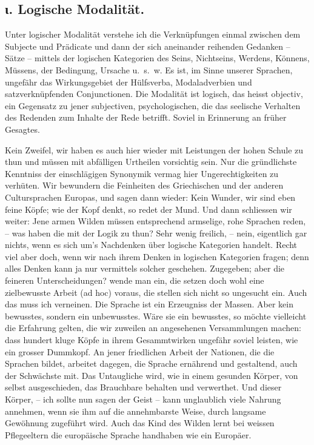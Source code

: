 \subsection*{ι. Logische Modalität.}\label{IV.IV.Iciota}

Unter logischer Modalität verstehe ich die Verknüpfungen einmal zwischen dem Subjecte und Prädicate und dann der sich aneinander reihenden Gedanken – Sätze – mittels der logischen Kategorien des Seins, Nichtseins, Werdens, Könnens, Müssens, der Bedingung, Ursache u.~s.~w. Es ist, im Sinne unserer Sprachen, ungefähr das Wirkungsgebiet der Hülfsverba, Modaladverbien und satzverknüpfenden Conjunctionen. Die Modalität ist logisch, das heisst objectiv, ein Gegensatz zu jener subjectiven, psychologischen, die das seelische Verhalten des Redenden zum Inhalte der Rede betrifft. Soviel in Erinnerung an früher Gesagtes.

\largerpage
Kein Zweifel, wir haben es auch hier wieder mit Leistungen der hohen Schule zu thun und müssen mit abfälligen Urtheilen vorsichtig sein. Nur die gründlichste Kenntniss der einschlägigen Synonymik vermag hier Ungerechtigkeiten zu verhüten. Wir bewundern die Feinheiten des Griechischen und der anderen Cultursprachen Europas, und sagen dann wieder: Kein Wunder, wir sind eben feine Köpfe; wie der Kopf denkt, so redet der Mund. Und dann schliessen wir weiter: Jene armen Wilden müssen entsprechend armselige, rohe Sprachen reden, – was haben die mit der Logik zu thun? Sehr wenig freilich, – nein, eigentlich gar nichts, wenn es sich um’s Nachdenken über logische Kategorien handelt. Recht viel aber doch, wenn wir nach ihrem Denken in logischen Kategorien fragen; denn alles Denken kann ja nur vermittels solcher geschehen. Zugegeben; aber die feineren Unterscheidungen? wende man ein, die setzen doch wohl eine zielbewusste Arbeit (ad hoc) voraus, die stellen sich nicht so ungesucht ein. Auch das muss ich verneinen. Die Sprache ist ein Erzeugniss der Massen. Aber kein bewusstes, sondern ein unbewusstes. Wäre sie ein bewusstes, so möchte vielleicht die Erfahrung gelten, die wir zuweilen an angesehenen Versammlungen machen: dass hundert kluge Köpfe in ihrem Gesammtwirken ungefähr soviel leisten, wie ein grosser Dummkopf. An jener friedlichen Arbeit der Nationen, die die Sprachen bildet, arbeitet dagegen, die Sprache er\label{fp.452}nährend und gestaltend, auch der Schwächste mit. Das Untaugliche wird, wie in einem gesunden Körper, von selbst ausgeschieden, das Brauchbare behalten und verwerthet. Und dieser Körper, – ich sollte nun sagen der Geist – kann unglaublich viele Nahrung annehmen, wenn sie ihm auf die annehmbarste Weise, durch langsame Gewöhnung zugeführt wird. Auch das Kind des Wilden lernt bei weissen Pflegeeltern die europäische Sprache handhaben wie ein Europäer.

